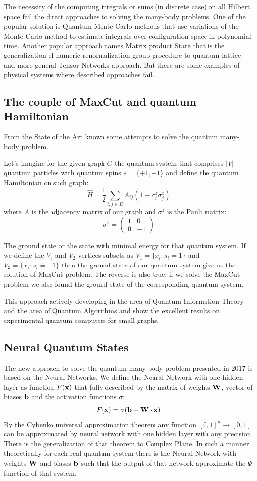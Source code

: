 \documentclass{article}
\begin{document}
The necessity of the computing integrals or sums (in discrete case) on all Hilbert space fail the direct approaches to solving the many-body problems. One of the popular solution is Quantum Monte Carlo methods that use variations of the Monte-Carlo method to estimate integrals over configuration space\cite{VMC} in polynomial time. Another popular approach names Matrix product State that is the generalization of numeric renormalization-group procedure to quantum lattice and more general Tensor Networks approach. But there are some examples of physical systems where described approaches fail\cite{VMCfail}.

\subsection{The couple of MaxCut and quantum Hamiltonian}
From the State of the Art\cite{MaxCutHam} known some attempts to solve the quantum many-body problem. 

Let's imagine for the given graph $G$ the quantum system that comprises $|V|$ quantum particles with quantum spins $s = \{+1, -1\}$ and define the quantum Hamiltonian on such graph:
$$\hat{H} = \frac{1}{2}\sum_{i,j \in E}A_{ij}(1 - \sigma^z_i\sigma^z_j)$$
where $A$ is the adjacency matrix of our graph and $\sigma^z$ is the Pauli matrix:
$$\sigma^z  = \begin{pmatrix}
	1& 0\\
	0& -1
\end{pmatrix}$$

The ground state or the state with minimal energy for that quantum system. If we define the $V_1$ and $V_2$ vertices subsets as $V_1 = \{x_i: s_i = 1\}$ and $V_2 = \{x_i: s_i = -1\}$ then the ground state of our quantum system give us the solution of MaxCut problem. The reverse is also true: if we solve the MaxCut problem we also found the ground state of the corresponding quantum system.

This approach actively developing in the area of Quantum Information Theory and the area of Quantum Algorithms\cite{QAOA}\cite{QA} and show the excellent results on experimental quantum computers for small graphs.


\subsection{Neural Quantum States}
The new approach to solve the quantum many-body problem presented in 2017\cite{CarleoScience} is based on the Neural Networks. We define the Neural Network with one hidden layer as function $F(\bf{x})$ that fully described by the matrix of weights $\bf{W}$, vector of biases $\bf{b}$ and the activation functions $\sigma$: $$F(\bf{x}) = \sigma(\bf{b} + \bf{W}\vdot{\bf{x}})$$By the Cybenko universal approximation theorem\cite{Cybenko} any function $[0, 1]^n\to{[0, 1]}$ can be approximated by neural network with one hidden layer with any precision. There is the generalization of that theorem to Complex Plane\cite{ComplexCybenko}. In such a manner theoretically for each real quantum system there is the Neural Network with weights $\bf{W}$ and biases $\bf{b}$ such that the output of that network approximate the $\Psi$ function of that system.
\end{document}
